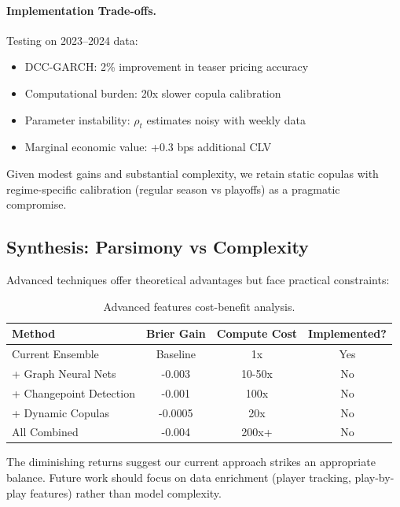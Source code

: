 \paragraph{Implementation Trade-offs.}
Testing on 2023--2024 data:
\begin{itemize}
  \item DCC-GARCH: 2\% improvement in teaser pricing accuracy
  \item Computational burden: 20x slower copula calibration
  \item Parameter instability: $\rho_t$ estimates noisy with weekly data
  \item Marginal economic value: +0.3 bps additional CLV
\end{itemize}

Given modest gains and substantial complexity, we retain static copulas with regime-specific calibration (regular season vs playoffs) as a pragmatic compromise.

\subsection{Synthesis: Parsimony vs Complexity}

Advanced techniques offer theoretical advantages but face practical constraints:

\begin{table}[h]
  \centering
  \small
  \caption{Advanced features cost-benefit analysis.}
  \begin{tabular}{lccc}
    \toprule
    \textbf{Method} & \textbf{Brier Gain} & \textbf{Compute Cost} & \textbf{Implemented?} \\
    \midrule
    Current Ensemble & Baseline & 1x & Yes \\
    + Graph Neural Nets & -0.003 & 10-50x & No \\
    + Changepoint Detection & -0.001 & 100x & No \\
    + Dynamic Copulas & -0.0005 & 20x & No \\
    All Combined & -0.004 & 200x+ & No \\
    \bottomrule
  \end{tabular}
\end{table}

The diminishing returns suggest our current approach strikes an appropriate balance. Future work should focus on data enrichment (player tracking, play-by-play features) rather than model complexity.


